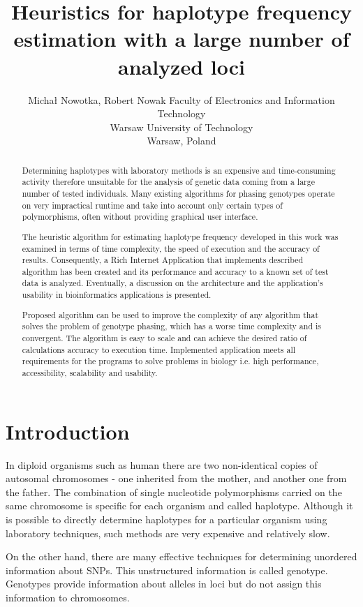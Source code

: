 \documentclass[]{spie}
\title{Heuristics for haplotype frequency estimation with a large number of analyzed loci}
\author{Micha\l{} Nowotka, Robert Nowak
  \skiplinehalf
  Faculty of Electronics and Information Technology\\
  Warsaw University of Technology\\
  Warsaw, Poland\\
}
\begin{document}
\maketitle

\begin{abstract}
Determining haplotypes with laboratory methods is an expensive and time-consuming
activity therefore unsuitable for the analysis of genetic data coming from a large number of tested
individuals. Many existing algorithms for phasing genotypes operate on very impractical runtime and
take into account only certain types of polymorphisms, often without providing graphical user interface.

The heuristic algorithm for estimating haplotype frequency developed in this work was
examined in terms of time complexity, the speed of execution and the accuracy of results. Consequently,
a Rich Internet Application that implements described algorithm has been created and its performance
and accuracy to a known set of test data is analyzed. Eventually, a discussion on the architecture and
the application’s usability in bioinformatics applications is presented.

Proposed algorithm can be used to improve the complexity of any algorithm that solves
the problem of genotype phasing, which has a worse time complexity and is convergent. The algorithm
is easy to scale and can achieve the desired ratio of calculations accuracy to execution time. Implemented
application meets all requirements for the programs to solve problems in biology i.e. high performance,
accessibility, scalability and usability.
\end{abstract}


\section{Introduction}
In diploid organisms such as human there are two non-identical copies of autosomal chromosomes - one inherited from the mother, and another one from the father.
The combination of single nucleotide polymorphisms carried on the same chromosome is specific for each organism and called haplotype.
Although it is possible to directly determine haplotypes for a particular organism using laboratory techniques, such methods are very expensive and relatively slow.

On the other hand, there are many effective techniques for determining unordered information about SNPs.
This unstructured information is called genotype.
Genotypes provide information about alleles in loci but do not assign this information to chromosomes.
\end{document}
